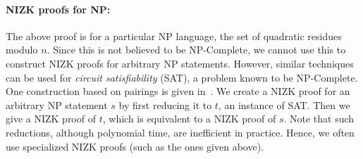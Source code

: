 \documentclass[]{report}   %
\begin{document}
\paragraph{NIZK proofs for NP:} The above proof is for a particular NP language, the set of quadratic residues modulo $n$. Since this is not believed to be NP-Complete, we cannot use this to construct NIZK proofs for arbitrary NP statements. However, similar techniques can be used for {\em circuit satisfiability} (SAT), a problem known to be NP-Complete. One construction based on pairings is given in~\cite{groth2006perfect}. We create a NIZK proof for an arbitrary NP statement $s$ by first reducing it to $t$, an instance of SAT. Then we give a NIZK proof of $t$, which is equivalent to a NIZK proof of $s$. Note that such reductions, although polynomial time, are inefficient in practice. Hence, we often use specialized NIZK proofs (such as the ones given above).
\end{document}
